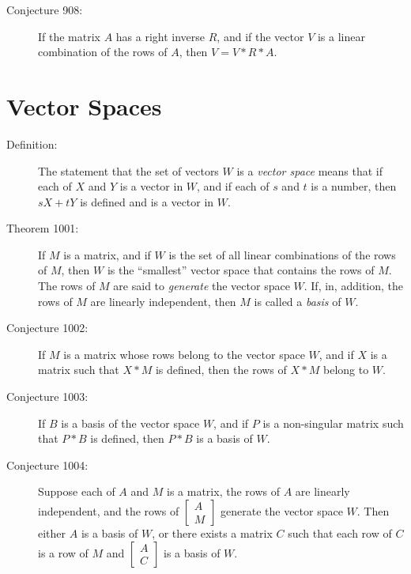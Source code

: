 \documentclass{article}
\begin{document}
\begin{description}
  \item[Conjecture 908:] If the matrix $A$ has a right inverse $R$, and if the vector $V$ is a linear combination of the rows of $A$, then $V=V*R*A$.

\end{description}


\section{Vector Spaces}

\begin{description}

  \item[Definition:] The statement that the set of vectors $W$ is a \emph{vector space} means that if each of $X$ and $Y$ is a vector in $W$, and if each of $s$ and $t$ is a number, then $sX+tY$ is defined and is a vector in $W$.

  \item[Theorem 1001:] If $M$ is a matrix, and if $W$ is the set of all linear combinations of the rows of $M$, then $W$ is the ``smallest'' vector space that contains the rows of $M$. The rows of $M$ are said to \emph{generate} the vector space $W$. If, in, addition, the rows of $M$ are linearly independent, then $M$ is called a \emph{basis} of $W$.

  \item[Conjecture 1002:] If $M$ is a matrix whose rows belong to the vector space $W$, and if $X$ is a matrix such that $X*M$ is defined, then the rows of $X*M$ belong to $W$.

  \item[Conjecture 1003:] If $B$ is a basis of the vector space $W$, and if $P$ is a non-singular matrix such that $P*B$ is defined, then $P*B$ is a basis of $W$.

  \item[Conjecture 1004:] Suppose each of $A$ and $M$ is a matrix, the rows of $A$ are linearly independent, and the rows of $ 
    \begin{bmatrix}
      A \\
      M
    \end{bmatrix}
    $ generate the vector space $W$. Then either $A$ is a basis of $W$, or there exists a matrix $C$ such that each row of $C$ is a row of $M$ and $ 
    \begin{bmatrix}
      A \\
      C
    \end{bmatrix}
    $ is a basis of $W$.


\end{description}
\end{document}
